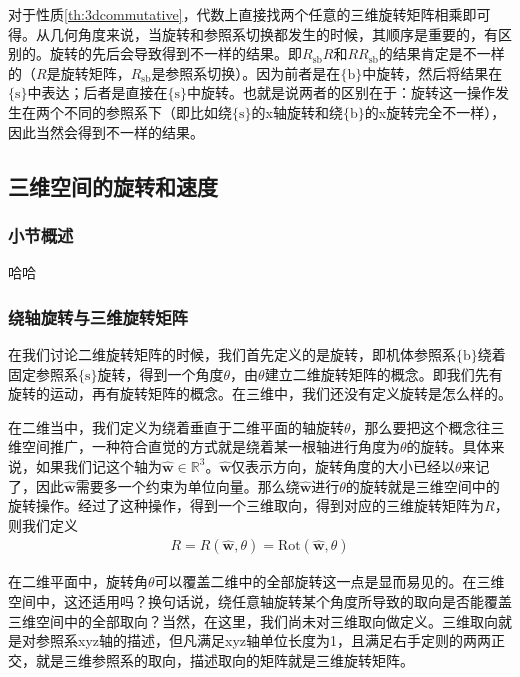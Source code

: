 \documentclass[12pt, a4paper, article, UTF8]{ctexart}
\begin{document}
对于性质\ref{th:3dcommutative}，代数上直接找两个任意的三维旋转矩阵相乘即可得。从几何角度来说，当旋转和参照系切换都发生的时候，其顺序是重要的，有区别的。旋转的先后会导致得到不一样的结果。即$R_\text{sb}R$和$RR_\text{sb}$的结果肯定是不一样的（$R$是旋转矩阵，$R_\text{sb}$是参照系切换）。因为前者是在$\{\text{b}\}$中旋转，然后将结果在$\{\text{s}\}$中表达；后者是直接在$\{\text{s}\}$中旋转。也就是说两者的区别在于：旋转这一操作发生在两个不同的参照系下（即比如绕$\{\text{s}\}$的x轴旋转和绕$\{\text{b}\}$的x旋转完全不一样），因此当然会得到不一样的结果。

\subsection{三维空间的旋转和速度}

\subsubsection{小节概述}
哈哈

\subsubsection{绕轴旋转与三维旋转矩阵}
在我们讨论二维旋转矩阵的时候，我们首先定义的是旋转，即机体参照系$\{\text{b}\}$绕着固定参照系$\{\text{s}\}$旋转，得到一个角度$\theta$，由$\theta$建立二维旋转矩阵的概念。即我们先有旋转的运动，再有旋转矩阵的概念。在三维中，我们还没有定义旋转是怎么样的。

在二维当中，我们定义为绕着垂直于二维平面的轴旋转$\theta$，那么要把这个概念往三维空间推广，一种符合直觉的方式就是绕着某一根轴进行角度为$\theta$的旋转。具体来说，如果我们记这个轴为$\hat{\mathbf{w}}\in \mathbb{R}^3$。$\hat{\mathbf{w}}$仅表示方向，旋转角度的大小已经以$\theta$来记了，因此$\hat{\mathbf{w}}$需要多一个约束为单位向量。那么绕$\hat{\mathbf{w}}$进行$\theta$的旋转就是三维空间中的旋转操作。经过了这种操作，得到一个三维取向，得到对应的三维旋转矩阵为$R$，则我们定义
\begin{align}
R = R(\hat{\mathbf{w}}, \theta) = \text{Rot}(\hat{\mathbf{w}}, \theta) \label{eq:3daxisrotation}
\end{align}

在二维平面中，旋转角$\theta$可以覆盖二维中的全部旋转这一点是显而易见的。在三维空间中，这还适用吗？换句话说，绕任意轴旋转某个角度所导致的取向是否能覆盖三维空间中的全部取向？当然，在这里，我们尚未对三维取向做定义。三维取向就是对参照系xyz轴的描述，但凡满足xyz轴单位长度为1，且满足右手定则的两两正交，就是三维参照系的取向，描述取向的矩阵就是三维旋转矩阵。
\end{document}
